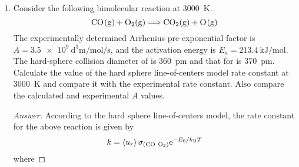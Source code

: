 \documentclass[../psets.tex]{subfiles}
\begin{document}
\begin{enumerate}[label={\textbf{30-\arabic*.}},leftmargin=3.5em]
\begin{proof}[Answer]
\begin{align*}
            &= \pi\left( \frac{\num{9.10e-10}}{2} \right)^2\left( \frac{8(\num{1.381e-23})(\num{300})(\num{1.675e-25})}{\pi(\num{4.983e-26})(\num{1.177e-25})} \right)^{1/2}\\
            &= \SI[per-mode=fraction,fraction-function=\tfrac]{3.57e-16}{\cubic\meter\per\second}\\
            \Aboxed{k &= \SI{2.15e11}{\per\molar\per\second}}
        \end{align*}
        The experimental rate constant is given by the Arrhenius equation as follows.
        \begin{align*}
            k' &= A\e[-E_a/RT]\\
            &= (\num{3.981e9})\e[-(\num{84900})/(\num{8.3145})(\num{300})]\\
            &= (\num{3.981e9})\e[-34.0]\\
            &= (\num{3.981e9})(\num{2e-15})\\
            &= \SI{8e-6}{\per\molar\per\second}
        \end{align*}
        Thus, the ratio of $k$ to $k'$ is
        \begin{equation*}
            \boxed{\frac{k}{k'} = \num{3e16}}
        \end{equation*}
    \end{proof}
    \setcounter{enumi}{4}
    \item Consider the following bimolecular reaction at \SI{3000}{\kelvin}.
    \begin{equation*}
        \ce{CO(g) + O2(g)} \Longrightarrow \ce{CO2(g) + O(g)}
    \end{equation*}
    The experimentally determined Arrhenius pre-exponential factor is $A=\SI{3.5e9}{\cubic\deci\meter\per\mole\per\second}$, and the activation energy is $E_a=\SI{213.4}{\kilo\joule\per\mole}$. The hard-sphere collision diameter of  is \SI{360}{\pico\meter} and that for  is \SI{370}{\pico\meter}. Calculate the value of the hard sphere line-of-centers model rate constant at \SI{3000}{\kelvin} and compare it with the experimental rate constant. Also compare the calculated and experimental $A$ values.
    \begin{proof}[Answer]
        According to the hard sphere line-of-centers model, the rate constant for the above reaction is given by
        \begin{equation*}
            k = \prb{u_r}\sigma_{(\ce{CO}\ \ce{O2})}\e[-E_0/\kB T]
        \end{equation*}
        where

\end{proof}
\end{enumerate}
\end{document}

